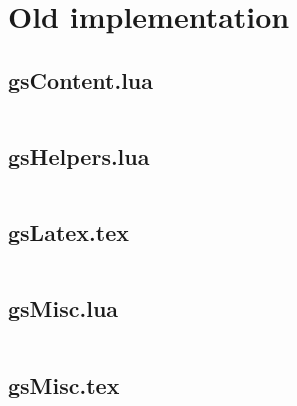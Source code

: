 \documentclass[11pt]{article}
\begin{document}
\pagebreak


\section{Old implementation}

\subsection{gsContent.lua}

\inputminted{lua}{media/gsContent.lua}

\subsection{gsHelpers.lua}

\inputminted{lua}{media/gsHelpers.lua}

\subsection{gsLatex.tex}

\inputminted{latex}{media/gsLatex.tex}

\subsection{gsMisc.lua}

\inputminted{lua}{media/gsMisc.lua}

\subsection{gsMisc.tex}

\inputminted{latex}{media/gsMisc.tex}
\end{document}
